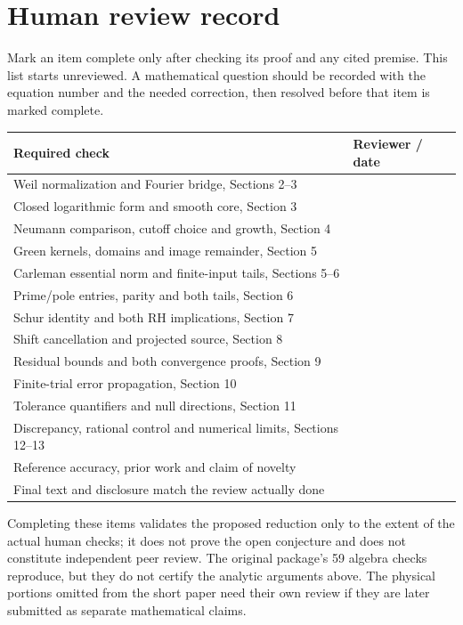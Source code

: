 \clearpage
\section{Human review record}
Mark an item complete only after checking its proof and any cited premise.
This list starts unreviewed. A mathematical question should be recorded
with the equation number and the needed correction, then resolved before
that item is marked complete.
\begin{center}
\begin{tabular}{p{}p{}}
\toprule
Required check & Reviewer / date\\\midrule
Weil normalization and Fourier bridge, Sections 2--3 & \hrulefill\\[7pt]
Closed logarithmic form and smooth core, Section 3 & \hrulefill\\[7pt]
Neumann comparison, cutoff choice and growth, Section 4 & \hrulefill\\[7pt]
Green kernels, domains and image remainder, Section 5 & \hrulefill\\[7pt]
Carleman essential norm and finite-input tails, Sections 5--6 & \hrulefill\\[7pt]
Prime/pole entries, parity and both tails, Section 6 & \hrulefill\\[7pt]
Schur identity and both RH implications, Section 7 & \hrulefill\\[7pt]
Shift cancellation and projected source, Section 8 & \hrulefill\\[7pt]
Residual bounds and both convergence proofs, Section 9 & \hrulefill\\[7pt]
Finite-trial error propagation, Section 10 & \hrulefill\\[7pt]
Tolerance quantifiers and null directions, Section 11 & \hrulefill\\[7pt]
Discrepancy, rational control and numerical limits, Sections 12--13 & \hrulefill\\[7pt]
Reference accuracy, prior work and claim of novelty & \hrulefill\\[7pt]
Final text and disclosure match the review actually done & \hrulefill\\[7pt]
\bottomrule
\end{tabular}
\end{center}
Completing these items validates the proposed reduction only to the extent
of the actual human checks; it does not prove the open conjecture and does
not constitute independent peer review. The original package's 59 algebra
checks reproduce, but they do not certify the analytic arguments above.
The physical portions omitted from the short paper need their own review
if they are later submitted as separate mathematical claims.

